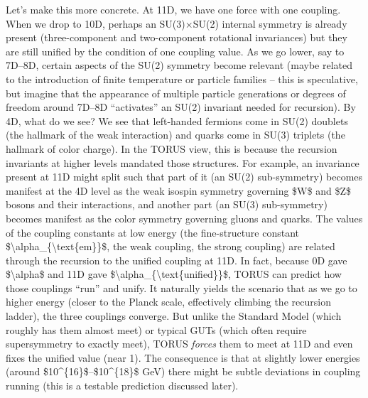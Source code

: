 \documentclass[]{article}
\begin{document}
Let's make this more concrete. At 11D, we have one force with one
coupling. When we drop to 10D, perhaps an SU(3)×SU(2) internal symmetry
is already present (three-component and two-component rotational
invariances) but they are still unified by the condition of one coupling
value. As we go lower, say to 7D--8D, certain aspects of the SU(2)
symmetry become relevant (maybe related to the introduction of finite
temperature or particle families -- this is speculative, but imagine
that the appearance of multiple particle generations or degrees of
freedom around 7D--8D ``activates'' an SU(2) invariant needed for
recursion). By 4D, what do we see? We see that left-handed fermions come
in SU(2) doublets (the hallmark of the weak interaction) and quarks come
in SU(3) triplets (the hallmark of color charge). In the TORUS view,
this is because the recursion invariants at higher levels mandated those
structures. For example, an invariance present at 11D might split such
that part of it (an SU(2) sub-symmetry) becomes manifest at the 4D level
as the weak isospin symmetry governing \$W\$ and \$Z\$ bosons and their
interactions, and another part (an SU(3) sub-symmetry) becomes manifest
as the color symmetry governing gluons and quarks. The values of the
coupling constants at low energy (the fine-structure constant
\$\textbackslash{}alpha\_\{\textbackslash{}text\{em\}\}\$, the weak
coupling, the strong coupling) are related through the recursion to the
unified coupling at 11D. In fact, because 0D gave
\$\textbackslash{}alpha\$ and 11D gave
\$\textbackslash{}alpha\_\{\textbackslash{}text\{unified\}\}\$, TORUS
can predict how those couplings ``run'' and unify. It naturally yields
the scenario that as we go to higher energy (closer to the Planck scale,
effectively climbing the recursion ladder), the three couplings
converge. But unlike the Standard Model (which roughly has them almost
meet) or typical GUTs (which often require supersymmetry to exactly
meet), TORUS \emph{forces} them to meet at 11D and even fixes the
unified value (near 1). The consequence is that at slightly lower
energies (around \$10\^{}\{16\}\$--\$10\^{}\{18\}\$ GeV) there might be
subtle deviations in coupling running (this is a testable prediction
discussed later).
\end{document}
